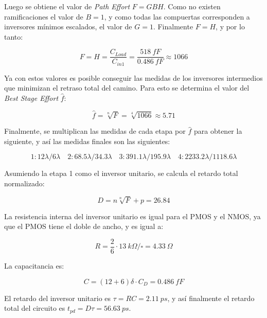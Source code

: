 \documentclass[letterpaper, 12pt]{article}
\numberwithin{equation}{section}
\begin{document}
Luego se obtiene el valor de \emph{Path Effort} \(F = GBH\). Como no existen ramificaciones el valor de \(B = 1\), y como todas las compuertas corresponden a inversores mínimos escalados, el valor de \(G = 1\). Finalmente \(F = H\), y por lo tanto:

\begin{equation}
  F = H = \frac{C_{Load}}{C_{in1}} = \frac{\SI{518}{fF}}{\SI{0.486}{fF}} \approx 1066
\end{equation}

Ya con estos valores es posible conseguir las medidas de los inversores intermedios que minimizan el retraso total del camino. Para esto se determina el valor del \emph{Best Stage Effort} \(\hat{f}\):

\begin{equation}
  \hat{f} = \sqrt[n]{F} = \sqrt[4]{1066} \approx 5.71
\end{equation}

Finalmente, se multiplican las medidas de cada etapa por \(\hat{f}\) para obtener la siguiente, y así las medidas finales son las siguientes:

\begin{equation}
  1:12\lambda/6\lambda \quad 2:68.5\lambda/34.3\lambda \quad 3: 391.1\lambda/195.9\lambda \quad 4:2233.2\lambda/1118.6\lambda
\end{equation}

Asumiendo la etapa 1 como el inversor unitario, se calcula el retardo total normalizado:

\begin{equation}
  D = n\sqrt[n]{F} + p = 26.84
\end{equation}

La resistencia interna del inversor unitario es igual para el PMOS y el NMOS, ya que el PMOS tiene el doble de ancho, y es igual a:

\begin{equation}
  R = \frac{2}{6}\cdot \SI{13}{k\Omega/\square} = \SI{4.33}{\Omega}
\end{equation}

La capacitancia es:

\begin{equation}
  C = (12 + 6)\delta \cdot C_D = \SI{0.486}{fF}
\end{equation}

El retardo del inversor unitario es \(\tau = RC = \SI{2.11}{ps}\), y así finalmente el retardo total del circuito es \(t_{pd} = D\tau = \SI{56.63}{ps}\).
\end{document}
